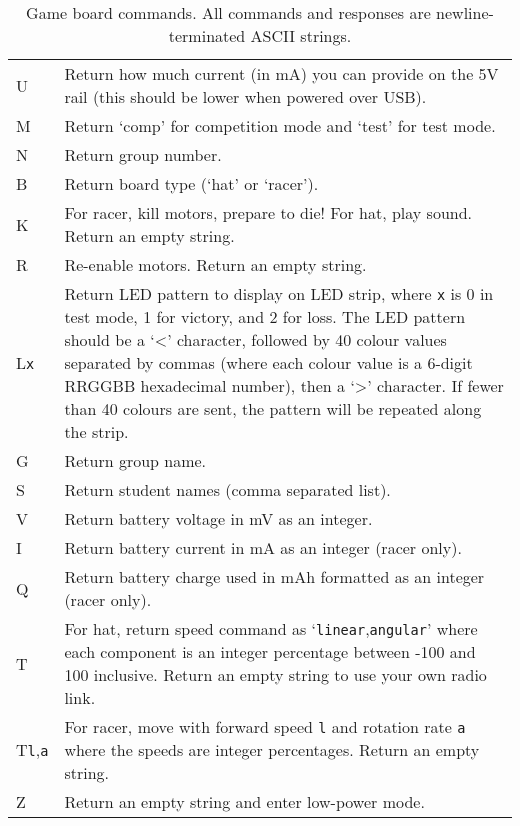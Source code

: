 \documentclass[11pt, a4paper]{article}
\begin{document}
\begin{table}[H]
  \centering
  \begin{tabularx}{\textwidth}{l X}
    U & Return how much current (in mA) you can provide on the 5V rail (this should be lower when powered over USB).  \\
    M & Return `comp' for competition mode and `test' for test mode. \\
    N & Return group number. \\
    B & Return board type (`hat' or `racer'). \\
    K & For racer, kill motors, prepare to die!  For hat, play sound.  Return an empty string. \\
    R & Re-enable motors.  Return an empty string. \\
    L\texttt{x} & Return LED pattern to display on LED strip, where \texttt{x} is 0 in test mode, 1 for victory, and 2 for loss.  The LED pattern should be a `<' character, followed by 40 colour values separated by commas (where each colour value is a 6-digit RRGGBB hexadecimal number), then a `>' character.  If fewer than 40 colours are sent, the pattern will be repeated along the strip.  \\
    G & Return group name. \\
    S & Return student names (comma separated list). \\
    V & Return battery voltage in mV as an integer.  \\
    I & Return battery current in mA as an integer (racer only). \\
    Q & Return battery charge used in mAh formatted as an integer (racer only). \\
    T & For hat, return speed command as
    `\texttt{linear},\texttt{angular}' where each component is an
    integer percentage between -100 and 100 inclusive.
    Return an empty string to use your own radio link.  \\
    T\texttt{l},\texttt{a} & For racer, move with forward speed \texttt{l} and rotation rate \texttt{a} where the speeds are integer percentages.  Return an empty string. \\
    Z & Return an empty string and enter low-power mode. \\
  \end{tabularx}
  \caption{Game board commands.  All commands and responses are
    newline-terminated ASCII strings.}
  \label{tab:board-commands}
\end{table}
\end{document}
